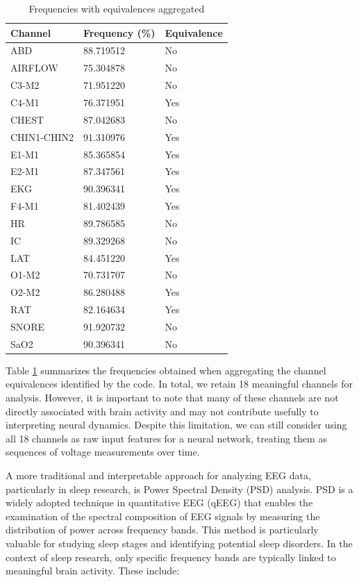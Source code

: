 \begin{minipage}{0.45\textwidth}
\begin{table}[H]
\begin{center}
\begin{tabular}{ |p{3cm}||p{3cm}||p{3cm}| }
 \hline
 Channel & Frequency (\%) & Equivalence\\
 \hline
 ABD & 88.719512 & No \\ 
 AIRFLOW & 75.304878 & No \\  
 C3-M2 & 71.951220 & No \\
 C4-M1 & 76.371951 & Yes \\
 CHEST & 87.042683 & No \\
 CHIN1-CHIN2 & 91.310976 & Yes \\
 E1-M1 & 85.365854 & Yes \\
 E2-M1 & 87.347561 & Yes \\
 EKG & 90.396341 & Yes \\
 F4-M1 & 81.402439 & Yes \\
 HR & 89.786585 & No \\
 IC & 89.329268 & No \\
 LAT & 84.451220 & Yes \\
 O1-M2 & 70.731707 & No \\
 O2-M2 & 86.280488 & Yes \\
 RAT & 82.164634 & Yes \\
 SNORE & 91.920732 & No \\
 SaO2 & 90.396341 & No \\
 \hline
\end{tabular}
\end{center}
\caption{Frequencies with equivalences aggregated}
\label{tab2}
\end{table}
\end{minipage}%
\restoregeometry

Table \ref{tab2} summarizes the frequencies obtained when aggregating the channel equivalences identified by the code. In total, we retain 18 meaningful channels for analysis. However, it is important to note that many of these channels are not directly associated with brain activity and may not contribute usefully to interpreting neural dynamics. Despite this limitation, we can still consider using all 18 channels as raw input features for a neural network, treating them as sequences of voltage measurements over time.

A more traditional and interpretable approach for analyzing EEG data, particularly in sleep research, is Power Spectral Density (PSD) analysis. PSD is a widely adopted technique in quantitative EEG (qEEG) that enables the examination of the spectral composition of EEG signals by measuring the distribution of power across frequency bands. This method is particularly valuable for studying sleep stages and identifying potential sleep disorders. In the context of sleep research, only specific frequency bands are typically linked to meaningful brain activity. These include:

